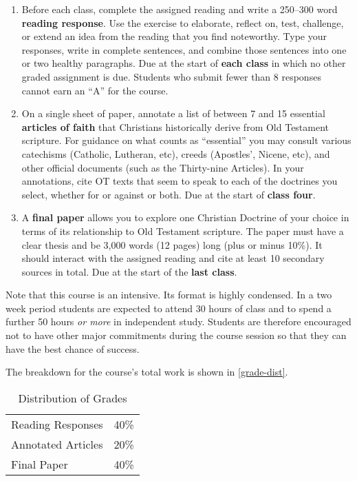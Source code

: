 \documentclass[titlepage]{article}
\newcommand\policy{../policy}
\begin{document}
\begin{enumerate}%

	\item Before each class, complete the assigned reading and write a
	250--300 word \textbf{reading response}. Use the exercise to
	elaborate, reflect on, test, challenge, or extend an idea from the
	reading that you find noteworthy. Type your responses, write in
	complete sentences, and combine those sentences into one or two
	healthy paragraphs. Due at the start of \textbf{each class} in which
	no other graded assignment is due. Students who submit fewer than 8
	responses cannot earn an “A” for the course.

	\item On a single sheet of paper, annotate a list of between 7 and
	15 essential \textbf{articles of faith} that Christians historically
	derive from Old Testament scripture. For guidance on what counts as
	“essential” you may consult various catechisms (Catholic, Lutheran,
	etc), creeds (Apostles', Nicene, etc), and other official documents
	(such as the Thirty-nine Articles). In your annotations, cite OT
	texts that seem to speak to each of the doctrines you select,
	whether for or against or both. Due at the start of \textbf{class four}.

	\item A \textbf{final paper} allows you to explore one Christian
	Doctrine of your choice in terms of its relationship to Old
	Testament scripture. The paper must have a clear thesis and be 3,000
	words (12 pages) long (plus or minus 10\%). It should interact with
	the assigned reading and cite at least 10 secondary sources in
	total. Due at the start of the \textbf{last class}.

\end{enumerate}

Note that this course is an intensive. Its format is highly condensed.
In a two week period students are expected to attend 30 hours of class
and to spend a further 50 hours \emph{or more} in independent study.
Students are therefore encouraged not to have other major commitments
during the course session so that they can have the best chance of
success.

The breakdown for the course's total work is shown in
\autoref{grade-dist}.

\begin{table}[htbp]
  \centering
  {\lining
  \begin{tabular}{lr}
    \toprule
    Reading Responses  & 40\% \\
    Annotated Articles & 20\% \\
    Final Paper        & 40\% \\
    \bottomrule
  \end{tabular}}
  \caption{Distribution of Grades}
  \label{grade-dist}
\end{table}



\end{document}
